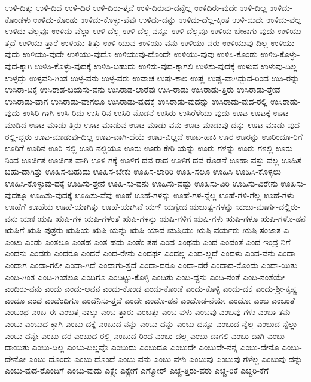 {ಉಳಿ-ದಿತ್ತು
ಉಳಿ-ದಿದೆ
ಉಳಿ-ದಿರ
ಉಳಿ-ದಿರು-ತ್ತವೆ
ಉಳಿ-ದಿರುವು-ದನ್ನೆಲ್ಲ
ಉಳಿದಿರು-ವುದೇ
ಉಳಿ-ದಿಲ್ಲ
ಉಳಿದು-ಕೊಂಡಳು
ಉಳಿದು-ಕೊಂಡು
ಉಳಿದು-ಕೊಳ್ಳು-ವೆವು
ಉಳಿದು-ದನ್ನು
ಉಳಿದು-ದೆಲ್ಲ-ಕ್ಕಿಂತ
ಉಳಿ-ದುದೇ
ಉಳಿದು-ವೆಲ್ಲ
ಉಳಿದು-ವೆಲ್ಲವೂ
ಉಳಿದು-ವೆಲ್ಲಾ
ಉಳಿ-ದೆಲ್ಲ
ಉಳಿ-ದೆಲ್ಲ-ವನ್ನೂ
ಉಳಿ-ದೆಲ್ಲವೂ
ಉಳಿಯ-ಬೇಕಾಗು-ವುದು
ಉಳಿಯು-ತ್ತದೆ
ಉಳಿಯು-ತ್ತಾರೆ
ಉಳಿಯು-ತ್ತಿತ್ತು
ಉಳಿ-ಯುವ
ಉಳಿಯು-ವನು
ಉಳಿಯು-ವರು
ಉಳಿಯುವು-ದಿಲ್ಲ
ಉಳಿಯು-ವುದು
ಉಳಿಯು-ವುದೇ
ಉಳಿಯು-ವುದೊ
ಉಳಿಯುವು-ದೊಂದೇ
ಉಳಿಯು-ವುವು
ಉಳಿಸಿ-ಕೊಂಡು
ಉಳಿಸಿ-ಕೊಳ್ಳು-ವುದ-ಕ್ಕಾಗಿ
ಉಳಿಸಿ-ಕೊಳ್ಳು-ವುದಕ್ಕೆ
ಉಳಿಸಿ-ಬಹುದು
ಉಳಿಸು-ವುದ-ಕ್ಕಾಗಲಿ
ಉಳಿಸು-ವುದಕ್ಕೆ
ಉಳುವ
ಉಳುವು-ದಿಲ್ಲ
ಉಳ್ಳದ್ದು
ಉಳ್ಳವನಿ-ಗಿಂತ
ಉಳ್ಳ-ವನು
ಉಳ್ಳ-ವರು
ಉವಾಚ
ಉಷಃ-ಕಾಲ
ಉಷ್ಣ
ಉಷ್ಣ-ವಾಗಿದ್ದುದ-ರಿಂದ
ಉಸಿ-ರನ್ನು
ಉಸಿರಾ-ಟಕ್ಕೆ
ಉಸಿರಾಡ-ಬಯಸು-ವನು
ಉಸಿರಾಡ-ಲಾರೆವು
ಉಸಿ-ರಾಡು
ಉಸಿರಾಡು-ತ್ತಿರು
ಉಸಿರಾಡು-ತ್ತೇವೆ
ಉಸಿರಾಡು-ವಾಗ
ಉಸಿರಾಡು-ವಾಗಲೂ
ಉಸಿರಾಡು-ವುದಕ್ಕೆ
ಉಸಿರಾಡು-ವುದನ್ನು
ಉಸಿರಾಡು-ವುದ-ರಲ್ಲಿ
ಉಸಿರಾಡು-ವುದು
ಉಸಿರಿ-ಗಾಗಿ
ಉಸಿ-ರಿದು
ಉಸಿ-ರಿನ
ಉಸಿರಿ-ನೊಡನೆ
ಉಸಿರು
ಉಸಿರೆಳೆಯು-ವುದು
ಊಟ
ಊಟಕ್ಕೆ
ಊಟ-ಮಾಡಿದ
ಊಟ-ಮಾಡು-ತ್ತಿರು
ಊಟ-ಮಾಡುವ
ಊಟ-ಮಾಡು-ವನು
ಊಟ-ಮಾಡುವು-ದನ್ನು
ಊಟ-ಮಾಡು-ವುದ-ರಲ್ಲಿ-ದ್ದರು
ಊಟ-ಮಾಡುವು-ದಿಲ್ಲ
ಊಟ-ವಾಗಿ-ದೆಯೆ
ಊಟ-ವಿಲ್ಲದೆ
ಊಟ-ಹಾಕಿ
ಊರ
ಊರನ್ನು
ಊರಿಂದೂ-ರಿಗೆ
ಊರಿಗೆ
ಊರಿನ
ಊರಿ-ನಲ್ಲಿ
ಊರಿ-ನಲ್ಲಿಯೂ
ಊರು
ಊರು-ಕೇರಿ-ಯನ್ನು
ಊರು-ಗಳನ್ನು
ಊರು-ಗಳಲ್ಲಿ
ಊರು-ನಿಂದ
ಊರ್ಜಿತ
ಊರ್ಜಿತ-ವಾಗಿ
ಊಳಿ-ಗಕ್ಕೆ
ಊಳಿಗ-ದವ-ರಾದ
ಊಳಿಗ-ದವ-ರೊಡನೆ
ಊಹಾ-ವಸ್ತು-ವಲ್ಲ
ಊಹಿಸ-ಬಹು-ದಾಗಿತ್ತು
ಊಹಿಸ-ಬಹುದು
ಊಹಿಸ-ಬೇಕು
ಊಹಿಸ-ಲಾರಿರಿ
ಊಹಿ-ಸಲೂ
ಊಹಿಸಿ
ಊಹಿಸಿ-ಕೊಳ್ಳಲು
ಊಹಿಸಿ-ಕೊಳ್ಳುವು-ದಕ್ಕೆ
ಊಹಿಸು-ತ್ತೇನೆ
ಊಹಿ-ಸು-ವನು
ಊಹಿಸು-ವಷ್ಟು
ಊಹಿಸು-ವಿರಿ
ಊಹಿಸು-ವಿರೇನು
ಊಹಿಸು-ವುದಕ್ಕೂ
ಊಹಿಸು-ವುದಕ್ಕೆ
ಊಹಿಸು-ವೆವು
ಊಹೆ
ಊಹೆ-ಗಳನ್ನು
ಊಹೆ-ಗಳ-ನ್ನೆಲ್ಲ
ಊಹೆ-ಗಳಿ-ಗೆಲ್ಲ
ಊಹೆ-ಗಳು
ಊಹೆಗೆ
ಊಹೆಯ
ಊಹೆ-ಯಾಗಿತ್ತು
ಊಹೆ-ಯಾಗಿವೆ
ಋಗ್
ಋಗ್ವೇದ
ಋಜುತ್ವ-ಗಳನ್ನು
ಋಜು-ಮಾರ್ಗ-ದಲ್ಲಿರು-ವನು
ಋಣಿ
ಋಷಿ
ಋಷಿ-ಗಳ
ಋಷಿ-ಗಳಂತೆ
ಋಷಿ-ಗಳನ್ನು
ಋಷಿ-ಗಳಿಗೆ
ಋಷಿ-ಗಳು
ಋಷಿ-ಗಳೂ
ಋಷಿ-ಗಳೊ-ಡನೆ
ಋಷಿಗೆ
ಋಷಿ-ಪುತ್ರರು
ಋಷಿಯ
ಋಷಿ-ಯನ್ನು
ಋಷಿ-ಯಾದ
ಋಷಿಯು
ಋಷಿ-ವರ್ಯರು
ಋಷಿ-ಸಂಜಾತ
ಎ
ಎಂಟು
ಎಂಡು
ಎಂತಲೂ
ಎಂತಹ
ಎಂತ-ಹದು
ಎಂತೆಂ-ತಹ
ಎಂಥ
ಎಂಥದು
ಎಂದ
ಎಂದಂತೆ
ಎಂದ-ಇಂದ್ರ-ನಿಗೆ
ಎಂದನು
ಎಂದರು
ಎಂದರೂ
ಎಂದರೆ
ಎಂದ-ರೇನು
ಎಂದರ್ಥ
ಎಂದಲ್ಲ
ಎಂದ-ಲ್ಲದೆ
ಎಂದಳು
ಎಂದ-ವನು
ಎಂದಾ
ಎಂದಾಗ
ಎಂದಾ-ಗಲೀ
ಎಂದಾ-ಗಿದೆ
ಎಂದಾಗು-ತ್ತದೆ
ಎಂದಾ-ದರೂ
ಎಂದಾ-ದರೆ
ಎಂದಾದ-ರೊಂದು
ಎಂದಾ-ಯಿತು
ಎಂದಿ-ಗಿಂತ
ಎಂದಿ-ಗಿಂತಲೂ
ಎಂದಿಗೂ
ಎಂದಿಟ್ಟು-ಕೊಳ್ಳಿ
ಎಂದಿತು
ಎಂದಿ-ದ್ದನು
ಎಂದಿ-ನಂತೆ
ಎಂದಿ-ನಂತೆಯೇ
ಎಂದಿರು-ವನು
ಎಂದು
ಎಂದು-ಅವನ
ಎಂದು-ಕೊಂಡ
ಎಂದು-ಕೊಂಡೆ
ಎಂದು-ಕೊಳ್ಳಿ
ಎಂದು-ದಕ್ಕೆ
ಎಂದು-ಶ್ರೀ-ಕೃಷ್ಣ
ಎಂದೂ
ಎಂದೆ
ಎಂದೆಂದಿಗೂ
ಎಂದೆನಿಸು-ತ್ತದೆ
ಎಂದೇ
ಎಂದೊ-ಡನೆ
ಎಂದೊಡ-ನೆಯೇ
ಎಂದೋ
ಎಂಬ
ಎಂಬಂತೆ
ಎಂಬಂಥ
ಎಂಬ-ಈ
ಎಂಬತ್ತ-ನಾಲ್ಕು
ಎಂಬ-ತ್ತಾರು
ಎಂಬತ್ತು
ಎಂಬ-ವಳು
ಎಂಬವು
ಎಂಬವು-ಗಳು
ಎಂಬಾ-ತನು
ಎಂಬು
ಎಂಬುದ-ಕ್ಕಾಗಿ
ಎಂಬು-ದಕ್ಕೆ
ಎಂಬುದ-ನನ್ನು
ಎಂಬು-ದನ್ನು
ಎಂಬು-ದನ್ನೂ
ಎಂಬುದ-ನ್ನೆಲ್ಲ
ಎಂಬುದ-ನ್ನೆಲ್ಲಾ
ಎಂಬು-ದನ್ನೇ
ಎಂಬು-ದರ
ಎಂಬುದ-ರಲ್ಲಿ
ಎಂಬುದ-ರಿಂದ
ಎಂಬು-ದಲ್ಲ
ಎಂಬು-ದಾಗಲಿ
ಎಂಬು-ದಾಗಿ
ಎಂಬು-ದಾಯಿತು
ಎಂಬು-ದಿಲ್ಲ
ಎಂಬು-ದಿಲ್ಲವೊ
ಎಂಬುದು
ಎಂಬುದೂ
ಎಂಬುದೇ
ಎಂಬುದೇ-ನನ್ನ
ಎಂಬು-ದೇನೊ
ಎಂಬು-ದೇನೋ
ಎಂಬು-ದೊಂದು
ಎಂಬು-ದೊಂದೆ
ಎಂಬು-ವನು
ಎಂಬು-ವಳು
ಎಂಬುವು
ಎಂಬುವು-ಗಳೆಲ್ಲ
ಎಂಬುವು-ದನ್ನು
ಎಂಬು-ವುದ-ರೊಂದಿಗೆ
ಎಂಬು-ವುದು
ಎಕ್ಸ್ರೇ
ಎಕ್ಸ್ರೇಗೆ
ಎಗ್ಮೋರ್
ಎಚ್ಚ-ತ್ತಿರು-ವರು
ಎಚ್ಚ-ರಿಕೆ
ಎಚ್ಚರಿ-ಕೆಗೆ
}
